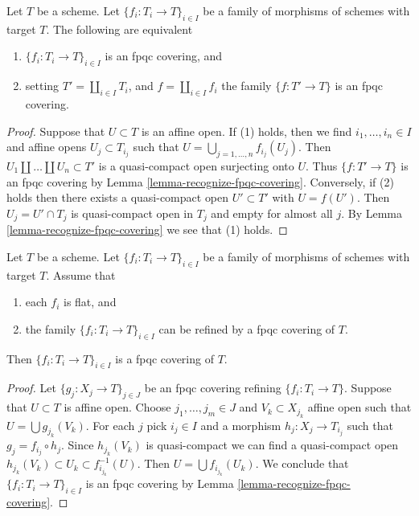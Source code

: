 \begin{lemma}
\label{lemma-disjoint-union-is-fpqc-covering}
Let $T$ be a scheme. Let $\{f_i : T_i \to T\}_{i \in I}$ be a family of
morphisms of schemes with target $T$. The following are equivalent
\begin{enumerate}
\item $\{f_i : T_i \to T\}_{i \in I}$ is an fpqc covering, and
\item setting $T' = \coprod_{i \in I} T_i$, and $f = \coprod_{i \in I} f_i$
the family $\{f : T' \to T\}$ is an fpqc covering.
\end{enumerate}
\end{lemma}

\begin{proof}
Suppose that $U \subset T$ is an affine open. If (1) holds, then we find
$i_1, \ldots, i_n \in I$ and affine opens $U_j \subset T_{i_j}$ such that
$U = \bigcup_{j = 1, \ldots, n} f_{i_j}(U_j)$. Then
$U_1 \amalg \ldots \amalg U_n \subset T'$ is a quasi-compact open surjecting
onto $U$. Thus $\{f : T' \to T\}$ is an fpqc covering by
Lemma \ref{lemma-recognize-fpqc-covering}.
Conversely, if (2) holds then there exists a quasi-compact open
$U' \subset T'$ with $U = f(U')$. Then $U_j = U' \cap T_j$ is quasi-compact
open in $T_j$ and empty for almost all $j$. By
Lemma \ref{lemma-recognize-fpqc-covering} we see that (1) holds.
\end{proof}

\begin{lemma}
\label{lemma-family-flat-dominated-covering}
Let $T$ be a scheme. Let $\{f_i : T_i \to T\}_{i \in I}$ be a family of
morphisms of schemes with target $T$. Assume that
\begin{enumerate}
\item each $f_i$ is flat, and
\item the family $\{f_i : T_i \to T\}_{i \in I}$ can be refined by a
fpqc covering of $T$.
\end{enumerate}
Then $\{f_i : T_i \to T\}_{i \in I}$ is a fpqc covering of $T$.
\end{lemma}

\begin{proof}
Let $\{g_j : X_j \to T\}_{j \in J}$ be an fpqc covering refining
$\{f_i : T_i \to T\}$. Suppose that $U \subset T$ is affine open.
Choose $j_1, \ldots, j_m \in J$ and $V_k \subset X_{j_k}$ affine
open such that $U = \bigcup g_{j_k}(V_k)$. For each $j$ pick $i_j \in I$
and a morphism $h_j : X_j \to T_{i_j}$ such that $g_j = f_{i_j} \circ h_j$.
Since $h_{j_k}(V_k)$ is quasi-compact we can find a quasi-compact
open $h_{j_k}(V_k) \subset U_k \subset f_{i_{j_k}}^{-1}(U)$.
Then $U = \bigcup f_{i_{j_k}}(U_k)$. We conclude that
$\{f_i : T_i \to T\}_{i \in I}$ is an fpqc covering by
Lemma \ref{lemma-recognize-fpqc-covering}.
\end{proof}

